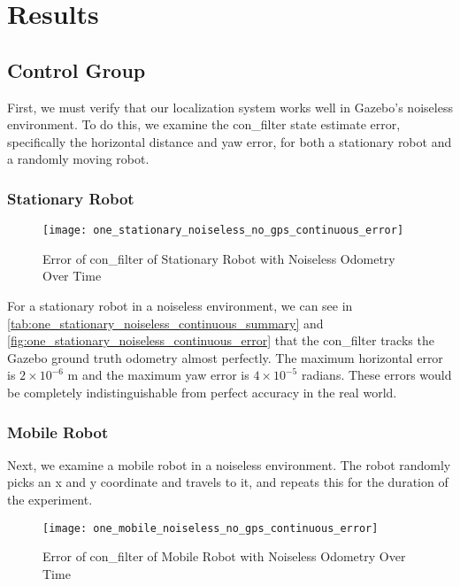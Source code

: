 \documentclass[thesis.tex]{subfile}
\begin{document}
\chapter{Results} \label{Results}
\section{Control Group} \label{sec:Control Group}
First, we must verify that our localization system works well in Gazebo's noiseless environment. To do this, we examine the \gls{con_filter} state estimate error, specifically the horizontal distance and yaw error, for both a stationary robot and a randomly moving robot.

\subsection{Stationary Robot}


\begin{figure}
\centering
\texttt{[image: one\_stationary\_noiseless\_no\_gps\_continuous\_error]}
\caption{Error of \gls{con_filter} of Stationary Robot with Noiseless Odometry Over Time}
\label{fig:one_stationary_noiseless_continuous_error}
\end{figure}

For a stationary robot in a noiseless environment, we can see in \autoref{tab:one_stationary_noiseless_continuous_summary} and \autoref{fig:one_stationary_noiseless_continuous_error} that the \gls{con_filter} tracks the Gazebo ground truth odometry almost perfectly. The maximum horizontal error is $2\times 10^{-6}$ m and the maximum yaw error is $4\times10^{-5}$ radians. These errors would be completely indistinguishable from perfect accuracy in the real world.

\subsection{Mobile Robot}
Next, we examine a mobile robot in a noiseless environment. The robot randomly picks an x and y coordinate and travels to it, and repeats this for the duration of the experiment. 



\begin{figure}
\centering
\texttt{[image: one\_mobile\_noiseless\_no\_gps\_continuous\_error]}
\caption{Error of \gls{con_filter} of Mobile Robot with Noiseless Odometry Over Time}
\label{fig:one_mobile_noiseless_no_gps_continuous_error}
\end{figure}
\end{document}
